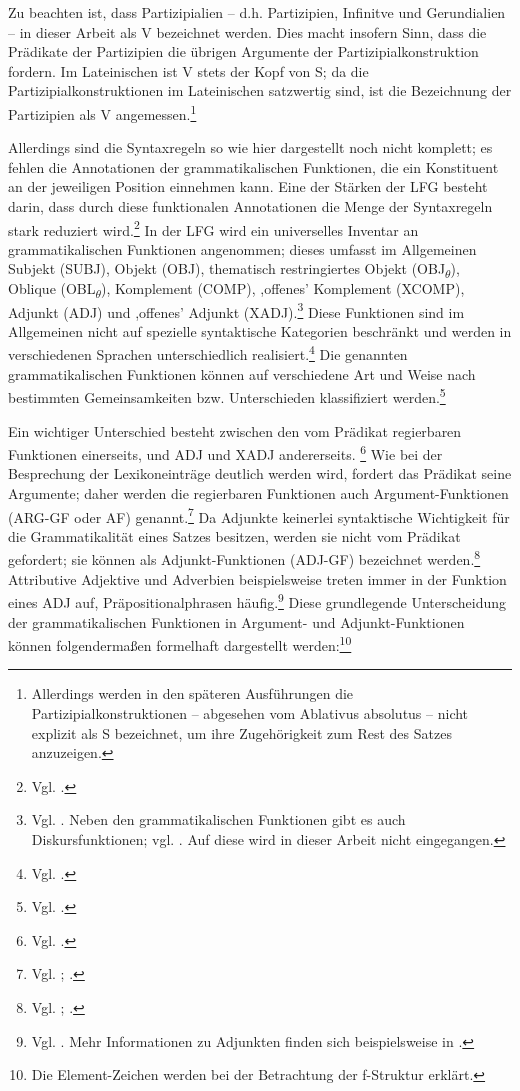 \documentclass[12pt,a4paper]{article}
\begin{document}
Zu beachten ist, dass Partizipialien – d.h. Partizipien, Infinitve und Gerundialien -- in dieser Arbeit als V bezeichnet werden. Dies macht insofern Sinn, dass die Prädikate der Partizipien die übrigen Argumente der Partizipialkonstruktion fordern. Im Lateinischen ist V stets der Kopf von S; da die Partizipialkonstruktionen im Lateinischen satzwertig sind, ist die Bezeichnung der Partizipien als V angemessen.\footnote{Allerdings werden in den späteren Ausführungen die Partizipialkonstruktionen -- abgesehen vom Ablativus absolutus -- nicht explizit als S bezeichnet, um ihre Zugehörigkeit zum Rest des Satzes anzuzeigen.}

Allerdings sind die Syntaxregeln so wie hier dargestellt noch nicht komplett; es fehlen die Annotationen der grammatikalischen Funktionen, die ein Konstituent an der jeweiligen Position einnehmen kann. Eine der Stärken der LFG besteht darin, dass durch diese funktionalen Annotationen die Menge der Syntaxregeln stark reduziert wird.\footnote{Vgl. \cite[45]{Dal}.} In der LFG wird ein universelles Inventar an grammatikalischen Funktionen angenommen; dieses umfasst im Allgemeinen Subjekt (SUBJ), Objekt (OBJ), thematisch restringiertes Objekt (OBJ\textsubscript{$\theta$}), Oblique (OBL\textsubscript{$\theta$}), Komplement (COMP), ,offenes' Komplement (XCOMP), Adjunkt (ADJ) und ,offenes' Adjunkt (XADJ).\footnote{Vgl. \cite[9]{Dal}. Neben den grammatikalischen Funktionen gibt es auch Diskursfunktionen; vgl. \cite[28; 76-84; 94-101]{Skript}. Auf diese wird in dieser Arbeit nicht eingegangen.} Diese Funktionen sind im Allgemeinen nicht auf spezielle syntaktische Kategorien beschränkt und werden in verschiedenen Sprachen unterschiedlich realisiert.\footnote{Vgl. \cite[9-10]{Bresnan}.} Die genannten grammatikalischen Funktionen können auf verschiedene Art und Weise nach bestimmten Gemeinsamkeiten bzw. Unterschieden klassifiziert werden.\footnote{Vgl. \cite[56-8]{Falk}.} 

Ein wichtiger Unterschied besteht zwischen den vom Prädikat regierbaren Funktionen einerseits, und ADJ und XADJ andererseits. \footnote{Vgl. \cite[56]{Falk}.} Wie bei der Besprechung der Lexikoneinträge deutlich werden wird, fordert das Prädikat seine Argumente; daher werden die regierbaren Funktionen auch Argument-Funktionen (ARG-GF oder AF) genannt.\footnote{Vgl. \cite[28]{Skript}; \cite[58]{Falk}.} Da Adjunkte keinerlei syntaktische Wichtigkeit für die Grammatikalität eines Satzes besitzen, werden sie nicht vom Prädikat gefordert; sie können als Adjunkt-Funktionen (ADJ-GF) bezeichnet werden.\footnote{Vgl. \cite[10-1]{Dal}; \cite[38]{Skript}.} Attributive Adjektive und Adverbien beispielsweise treten immer in der Funktion eines ADJ auf, Präpositionalphrasen häufig.\footnote{Vgl. \cite[38]{Skript}. Mehr Informationen zu Adjunkten finden sich beispielsweise in \cite[61-2]{Falk}.} Diese grundlegende Unterscheidung der grammatikalischen Funktionen in Argument- und Adjunkt-Funktionen können folgendermaßen formelhaft dargestellt werden:\footnote{Die Element-Zeichen werden bei der Betrachtung der f-Struktur erklärt.}
\end{document}
